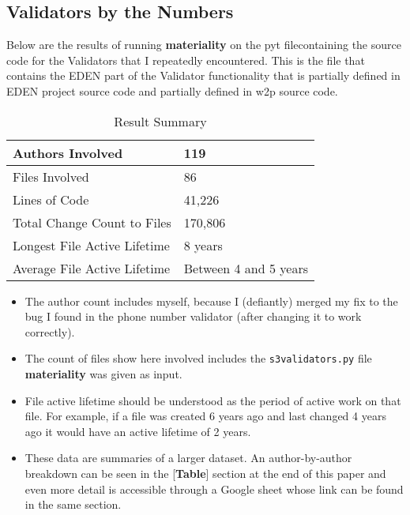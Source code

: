 \documentclass[a4paper,man,natbib,floatsintext]{apa6}
\begin{document}
  \subsection{Validators by the Numbers}
  Below are the results of running \textbf{materiality} on the \Gls{pyt} file\footnotemark containing the source code for the Validators that I repeatedly encountered. This is the file that contains the \gls{EDEN} part of the Validator functionality that is partially defined in \gls{EDEN} project source code and partially defined in \gls{w2p} source code.


  \begin{table}[ht]
  \caption{Result Summary}
  \label{tab:result-summary}
  \begin{tabular}{|l|l|}
  \hline
  Authors Involved               & 119                                   \\ \hline
  Files Involved                 & 86                                    \\ \hline
  Lines of Code                  & 41,226                                \\ \hline
  Total Change Count to Files    & 170,806                               \\ \hline
  Longest File Active Lifetime   & 8 years                               \\ \hline
  Average File Active Lifetime   & Between 4 and 5 years                 \\ \hline
  \end{tabular}
\end{table}
  
  \begin{itemize}
    \item The author count includes myself, because I (defiantly) merged my fix to the bug I found in the phone number validator (after changing it to work correctly).
    \item The count of files show here involved includes the \verb|s3validators.py| file \textbf{materiality} was given as input. 
    \item File active lifetime should be understood as the period of active work on that file. For example, if a file was created 6 years ago and last changed 4 years ago it would have an active lifetime of 2 years.
    \item These data are summaries of a larger dataset. An author-by-author breakdown can be seen in the [\textbf{Table}] section at the end of this paper and even more detail is accessible through a Google sheet whose link can be found in the same section.
  \end{itemize}
  
\end{document}
